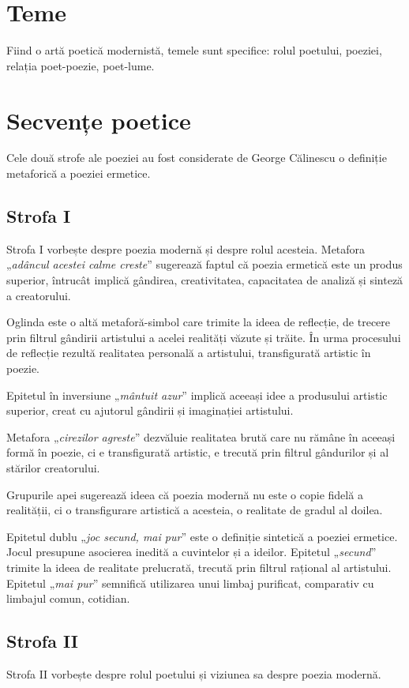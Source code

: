 \documentclass{article}
\newcommand{\qu}[1]{„\emph{#1}”}
\begin{document}
\section{Teme}
Fiind o artă poetică modernistă, temele sunt specifice: rolul poetului, poeziei, relația poet-poezie, poet-lume.

\section{Secvențe poetice}
Cele două strofe ale poeziei au fost considerate de George Călinescu o definiție metaforică a poeziei ermetice.

\subsection{Strofa I}
Strofa I vorbește despre poezia modernă și despre rolul acesteia. Metafora \qu{adâncul acestei calme creste} sugerează faptul că poezia ermetică este un produs superior, întrucât implică gândirea, creativitatea, capacitatea de analiză și sinteză a creatorului.

Oglinda este o altă metaforă-simbol care trimite la ideea de reflecție, de trecere prin filtrul gândirii artistului a acelei realități văzute și trăite. În urma procesului de reflecție rezultă realitatea personală a artistului, transfigurată artistic în poezie.

Epitetul în inversiune \qu{mântuit azur} implică aceeași idee a produsului artistic superior, creat cu ajutorul gândirii și imaginației artistului.

Metafora \qu{cirezilor agreste} dezvăluie realitatea brută care nu rămâne în aceeași formă în poezie, ci e transfigurată artistic, e trecută prin filtrul gândurilor și al stărilor creatorului.

Grupurile apei sugerează ideea că poezia modernă nu este o copie fidelă a realității, ci o transfigurare artistică a acesteia, o realitate de gradul al doilea.

Epitetul dublu \qu{joc secund, mai pur} este o definiție sintetică a poeziei ermetice. Jocul presupune asocierea inedită a cuvintelor și a ideilor. Epitetul \qu{secund} trimite la ideea de realitate prelucrată, trecută prin filtrul rațional al artistului. Epitetul \qu{mai pur} semnifică utilizarea unui limbaj purificat, comparativ cu limbajul comun, cotidian.

\subsection{Strofa II}
Strofa II vorbește despre rolul poetului și viziunea sa despre poezia modernă.
\end{document}
